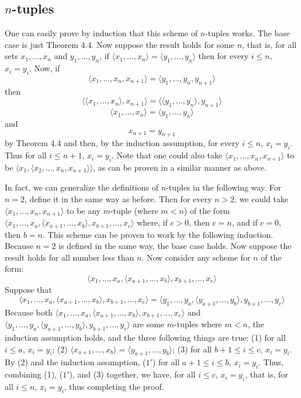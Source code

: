 \documentclass{article}
\theoremstyle{definition}
\begin{document}
\subsection*{$n$-tuples}
One can easily prove by induction that this scheme of $n$-tuples works. The base case is just Theorem 4.4. Now suppose the result holds for some $n$, that is, 
for all sets $x_1,...,x_n$ and $y_1,...,y_n$, if $\langle x_1,...,x_n\rangle =\langle y_1,...,y_n\rangle$ then for every $i\le n$, $x_i=y_i$. Now, if 
\[ \langle x_1,...,x_n,x_{n+1}\rangle =\langle y_1,...,y_n,y_{n+1}\rangle \] then 
\[ \langle \langle x_1,...,x_n\rangle ,x_{n+1}\rangle =\langle\langle y_1,...,y_n\rangle ,y_{n+1}\rangle \]
\[ \langle x_1,...,x_n\rangle =\langle y_1,...,y_n\rangle \]
and \[ x_{n+1}=y_{n+1} \] by Theorem 4.4 and then, by the induction assumption, for every $i\le n$,
$x_i=y_i$. Thus for all $i\le n+1$, $x_i=y_i$. Note that one could also take $\langle x_1,...,x_n,x_{n+1} \rangle$ to be 
$\langle x_1,\langle x_2,...,x_n,x_{n+1}\rangle\rangle$, as can be proven in a similar manner as above.


In fact, we can generalize the definitions of $n$-tuples in the following way. For $n=2$, define it in the same way as before. Then for every $n>2$, we could take 
$\langle x_1,...,x_n,x_{n+1}\rangle$ to be any $m$-tuple (where $m<n$) of the form 
$\langle x_1,...,x_a,\langle x_{a+1},...,x_b\rangle ,x_{b+1},...,x_c\rangle$ where, if $c>0$, then $c=n$, and if $c=0$, then $b=n$. 
This scheme can be proven to work by the following induction. Because 
$n=2$ is defined in the same way, the base case holds. Now suppose the result holds for all number less than $n$. Now consider any scheme for $n$ of the form:
\[ \langle x_1,...,x_a,\langle x_{a+1},...,x_b\rangle ,x_{b+1},...,x_c\rangle \] Suppose that 
\[ \langle x_1,...,x_a,\langle x_{a+1},...,x_b\rangle ,x_{b+1},...,x_c\rangle=\langle y_1,...,y_a,\langle y_{a+1},...,y_b\rangle ,y_{b+1},...,y_c\rangle \]
Because both $\langle x_1,...,x_a,\langle x_{a+1},...,x_b\rangle ,x_{b+1},...,x_c\rangle$ and $\langle y_1,...,y_a,\langle y_{a+1},...,y_b\rangle ,y_{b+1},...,y_c\rangle$ 
are some $m$-tuples where $m<n$, the induction assumption holds, and the three following things are true: (1) for all $i\le a$, $x_i=y_i$; 
(2) $\langle x_{a+1},...,x_b\rangle=\langle y_{a+1},...,y_b\rangle$; (3) for all $b+1\le i\le c$, $x_i=y_i$. By (2) and the induction assumption, 
($1'$) for all $a+1\le i\le b$, $x_i=y_i$. Thus, combining (1), ($1'$), and (3) together, we have, for all $i\le c$, $x_i=y_i$, that is, for all $i\le n$, 
$x_i=y_i$, thus completing the proof. 
\end{document}
